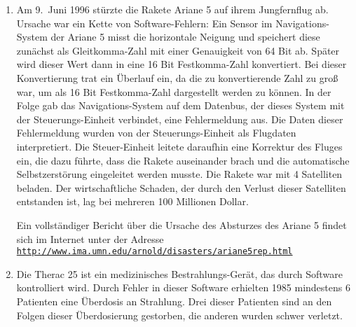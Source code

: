 \begin{enumerate}
\item Am 9.~Juni 1996 stürzte die Rakete Ariane 5 auf ihrem Jungfernflug ab.
      Ursache war ein Kette von Software-Fehlern:  Ein Sensor im Navigations-System
      der Ariane 5 misst die horizontale Neigung und speichert diese zunächst als Gleitkomma-Zahl
      mit einer Genauigkeit von 64 Bit ab.  Später wird dieser Wert dann in eine 
      16 Bit Festkomma-Zahl konvertiert.
      Bei dieser Konvertierung trat ein Überlauf ein, da die zu konvertierende Zahl
      zu groß war, um als 16 Bit Festkomma-Zahl dargestellt werden zu können.
      In der Folge gab das Navigations-System auf dem Datenbus, der dieses System mit
      der Steuerungs-Einheit verbindet, eine Fehlermeldung aus.
       Die Daten dieser Fehlermeldung wurden von der Steuerungs-Einheit als Flugdaten 
      interpretiert.  Die Steuer-Einheit leitete daraufhin eine Korrektur des
      Fluges ein, die dazu führte, dass die Rakete auseinander brach und die 
      automatische Selbstzerstörung eingeleitet werden musste.
      Die Rakete war mit 4 Satelliten beladen. Der wirtschaftliche Schaden, der durch den Verlust dieser
      Satelliten entstanden ist, lag bei mehreren 100 Millionen Dollar.
      
      Ein vollständiger Bericht über die Ursache des Absturzes des Ariane 5 findet sich
      im Internet unter der Adresse \\[0.1cm]
      \hspace*{1.3cm} 
      \href{http://www.ima.umn.edu/~arnold/disasters/ariane5rep.html}{\texttt{http://www.ima.umn.edu/arnold/disasters/ariane5rep.html}}
\item Die Therac 25 ist ein medizinisches Bestrahlungs-Gerät, das durch 
      Software kontrolliert wird.  Durch  Fehler in dieser Software erhielten 1985
      mindestens 6 Patienten eine Überdosis an Strahlung.  Drei dieser Patienten sind an den Folgen dieser 
      Überdosierung gestorben, die anderen wurden schwer verletzt.


\end{enumerate}
